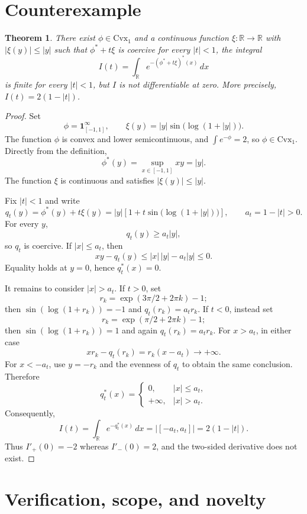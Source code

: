\documentclass[11pt]{article}
\newtheorem{theorem}{Theorem}
\begin{document}
\section{Counterexample}

\begin{theorem}
There exist $\phi\in\mathrm{Cvx}_1$ and a continuous function
$\xi:\mathbb R\to\mathbb R$ with $|\xi(y)|\leq |y|$ such that
$\phi^*+t\xi$ is coercive for every $|t|<1$, the integral
\[
 I(t)=\int_{\mathbb R}e^{-(\phi^*+t\xi)^*(x)}\,dx
\]
is finite for every $|t|<1$, but $I$ is not differentiable at zero.
More precisely, $I(t)=2(1-|t|)$.
\end{theorem}

\begin{proof}
Set
\[
 \phi=\mathbf 1_{[-1,1]}^\infty,
 \qquad
 \xi(y)=|y|\sin\!\bigl(\log(1+|y|)\bigr).
\]
The function $\phi$ is convex and lower semicontinuous, and
$\int e^{-\phi}=2$, so $\phi\in\mathrm{Cvx}_1$.  Directly from the definition,
\[
 \phi^*(y)=\sup_{x\in[-1,1]}xy=|y|.
\]
The function $\xi$ is continuous and satisfies $|\xi(y)|\leq|y|$.

Fix $|t|<1$ and write
\[
 q_t(y)=\phi^*(y)+t\xi(y)
 =|y|\left[1+t\sin\!\bigl(\log(1+|y|)\bigr)\right],
 \qquad a_t=1-|t|>0.
\]
For every $y$,
\[
 q_t(y)\geq a_t|y|,
\]
so $q_t$ is coercive.  If $|x|\leq a_t$, then
\[
 xy-q_t(y)\leq |x|\,|y|-a_t|y|\leq0.
\]
Equality holds at $y=0$, hence $q_t^*(x)=0$.

It remains to consider $|x|>a_t$.  If $t>0$, set
\[
 r_k=\exp(3\pi/2+2\pi k)-1;
\]
then $\sin(\log(1+r_k))=-1$ and $q_t(r_k)=a_t r_k$.  If
$t<0$, instead set
\[
 r_k=\exp(\pi/2+2\pi k)-1;
\]
then $\sin(\log(1+r_k))=1$ and again $q_t(r_k)=a_t r_k$.
For $x>a_t$, in either case
\[
 xr_k-q_t(r_k)=r_k(x-a_t)\longrightarrow+\infty.
\]
For $x<-a_t$, use $y=-r_k$ and the evenness of $q_t$ to obtain the same
conclusion.  Therefore
\[
 q_t^*(x)=
 \begin{cases}
 0,& |x|\leq a_t,\\
 +\infty,& |x|>a_t.
 \end{cases}
\]
Consequently,
\[
 I(t)=\int_{\mathbb R}e^{-q_t^*(x)}\,dx
 =\left|[-a_t,a_t]\right|=2(1-|t|).
\]
Thus $I'_+(0)=-2$ whereas $I'_-(0)=2$, and the two-sided derivative does not
exist.
\end{proof}

\section{Verification, scope, and novelty}
\end{document}
